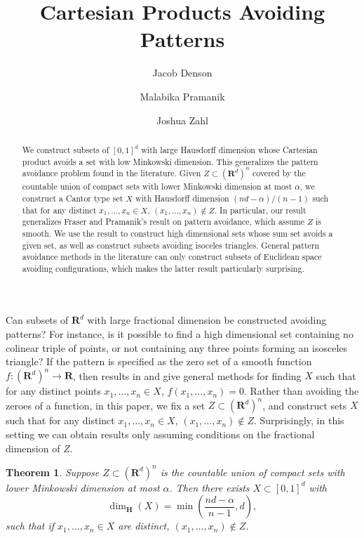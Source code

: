 \documentclass[usenames,dvipsnames]{article}
\title{Cartesian Products Avoiding Patterns}
\author{Jacob Denson\\ \and Malabika Pramanik\\ \and Joshua Zahl}
\theoremstyle{plain}
\theoremstyle{plain}
\newtheorem{theorem}{Theorem}
\begin{document}
\maketitle

\begin{abstract}
	We construct subsets of $[0,1]^d$ with large Hausdorff dimension whose Cartesian product avoids a set with low Minkowski dimension. This generalizes the pattern avoidance problem found in the literature. Given $Z \subset (\mathbf{R}^d)^n$ covered by the countable union of compact sets with lower Minkowski dimension at most $\alpha$, we construct a Cantor type set $X$ with Hausdorff dimension $(nd - \alpha) / (n-1)$ such that for any distinct $x_1, \dots, x_n \in X$, $(x_1, \dots, x_n) \not \in Z$.
		In particular, our result generalizes Fraser and Pramanik's result on pattern avoidance, which assume $Z$ is smooth.
	We use the result to construct high dimensional sets whose sum set avoids a given set, as well as construct subsets avoiding isoceles triangles. General pattern avoidance methods in the literature can only construct subsets of Euclidean space avoiding configurations, which makes the latter result particularly surprising.
\end{abstract}


Can subsets of $\mathbf{R}^d$ with large fractional dimension be constructed avoiding patterns? For instance, is it possible to find a high dimensional set containing no colinear triple of points, or not containing any three points forming an isosceles triangle? If the pattern is specified as the zero set of a smooth function $f: (\mathbf{R}^d)^n \to \mathbf{R}$, then results in \cite{MalabikaRob} and \cite{Mathe} give general methods for finding $X$ such that for any distinct points $x_1, \dots, x_n \in X$, $f(x_1, \dots, x_n) = 0$. Rather than avoiding the zeroes of a function, in this paper, we fix a set $Z \subset (\mathbf{R}^d)^n$, and construct sets $X$ such that for any distinct $x_1, \dots, x_n \in X$, $(x_1, \dots, x_n) \not \in Z$. Surprisingly, in this setting we can obtain results only assuming conditions on the fractional dimension of $Z$.

\begin{theorem}
	Suppose $Z \subset (\mathbf{R}^d)^n$ is the countable union of compact sets with lower Minkowski dimension at most $\alpha$. Then there exists $X \subset [0,1]^d$ with
	\[ \dim_{\mathbf{H}}(X) = \min \left( \frac{nd - \alpha}{n-1}, d \right), \]
	such that if $x_1, \dots, x_n \in X$ are distinct, $(x_1, \dots, x_n) \not \in Z$.
\end{theorem}
\end{document}
